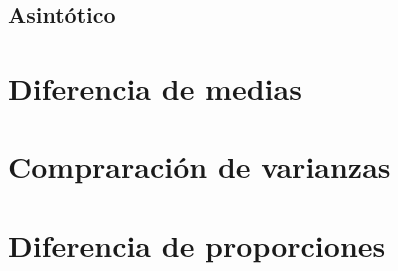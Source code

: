\documentclass[
]{book}
\begin{document}
\hypertarget{asintuxf3tico}{%
\subsection{Asintótico}\label{asintuxf3tico}}

\hypertarget{diferencia-de-medias-1}{%
\section{Diferencia de medias}\label{diferencia-de-medias-1}}

\hypertarget{compraraciuxf3n-de-varianzas}{%
\section{Compraración de varianzas}\label{compraraciuxf3n-de-varianzas}}

\hypertarget{diferencia-de-proporciones-1}{%
\section{Diferencia de proporciones}\label{diferencia-de-proporciones-1}}

  
\end{document}

